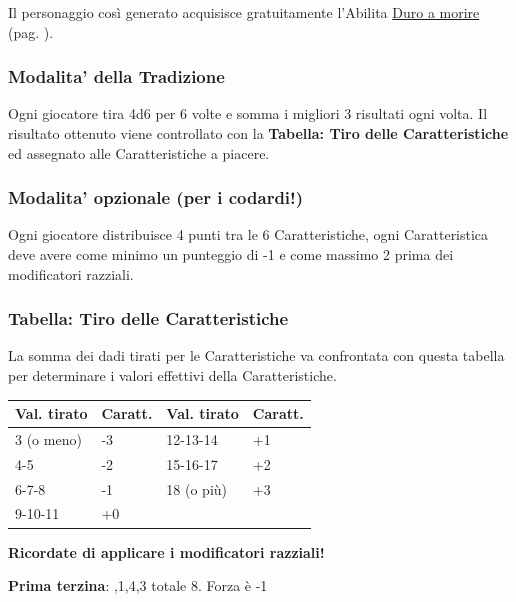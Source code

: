 \begin{multicols}{2}
Il personaggio così generato acquisisce gratuitamente l'Abilita \hyperlink{Duro a morire}{Duro a morire} (pag. \pageref{Duro a morire}).

\subsubsection{Modalita' della Tradizione}\label{modalitadellatradizione}

Ogni giocatore tira 4d6 per 6 volte e somma i migliori 3 risultati ogni volta. Il risultato ottenuto viene controllato con la \textbf{Tabella: Tiro delle Caratteristiche} ed assegnato alle Caratteristiche a piacere.

\subsubsection{Modalita' opzionale (per i codardi!)}\label{modalitapericodardi}

Ogni giocatore distribuisce 4 punti tra le 6 Caratteristiche, ogni Caratteristica deve avere come minimo un punteggio di -1 e come massimo 2 prima dei modificatori razziali.

\subsubsection{Tabella: Tiro delle Caratteristiche}

La somma dei dadi tirati per le Caratteristiche va confrontata con questa tabella per determinare i valori effettivi della Caratteristiche.

\medskip

\begin{tabularx}{0.45\textwidth}{lX|lX}
\textbf{Val. tirato}& \textbf{Caratt.}&\textbf{Val. tirato}& \textbf{Caratt.}\\
\toprule
3 (o meno)&-3&12-13-14&+1\\
4-5&-2&15-16-17&+2\\
6-7-8&-1&18 (o più)&+3\\
9-10-11&+0&&
\end{tabularx}

\medskip

\textbf{Ricordate di applicare i modificatori razziali!}

\medskip

\begin{changemargin}{0.3cm}{0.3cm}\begin{tcolorbox}[title = Tiriamo le Caratteristiche di Tups]
		\textbf{Prima terzina}: ,1,4,3 totale 8. Forza è -1
		

\end{tcolorbox}
\end{changemargin}
\end{multicols}

